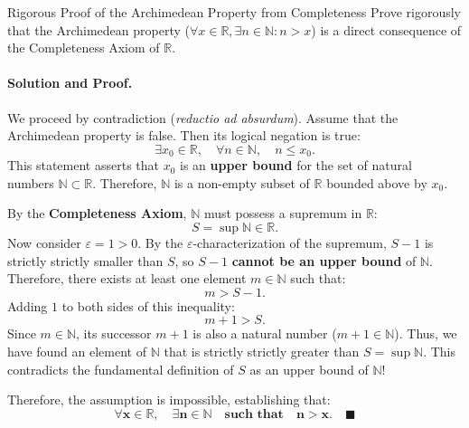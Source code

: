 \begin{workedexample}{Rigorous Proof of the Archimedean Property from Completeness}
Prove rigorously that the Archimedean property ($\forall x \in \mathbb{R}, \exists n \in \mathbb{N}: n > x$) is a direct consequence of the Completeness Axiom of $\mathbb{R}$.

\paragraph{Solution and Proof.}
We proceed by contradiction (\textit{reductio ad absurdum}).
Assume that the Archimedean property is false. Then its logical negation is true:
\[
\exists x_0 \in \mathbb{R}, \quad \forall n \in \mathbb{N}, \quad n \le x_0.
\]
This statement asserts that $x_0$ is an \textbf{upper bound} for the set of natural numbers $\mathbb{N} \subset \mathbb{R}$.
Therefore, $\mathbb{N}$ is a non-empty subset of $\mathbb{R}$ bounded above by $x_0$.

By the \textbf{Completeness Axiom}, $\mathbb{N}$ must possess a supremum in $\mathbb{R}$:
\[
S = \sup \mathbb{N} \in \mathbb{R}.
\]
Now consider $\varepsilon = 1 > 0$.
By the $\varepsilon$-characterization of the supremum, $S - 1$ is strictly strictly smaller than $S$, so $S - 1$ \textbf{cannot be an upper bound} of $\mathbb{N}$.
Therefore, there exists at least one element $m \in \mathbb{N}$ such that:
\[
m > S - 1.
\]
Adding $1$ to both sides of this inequality:
\[
m + 1 > S.
\]
Since $m \in \mathbb{N}$, its successor $m + 1$ is also a natural number ($m + 1 \in \mathbb{N}$).
Thus, we have found an element of $\mathbb{N}$ that is strictly strictly greater than $S = \sup \mathbb{N}$.
This contradicts the fundamental definition of $S$ as an upper bound of $\mathbb{N}$!

Therefore, the assumption is impossible, establishing that:
\[
\mathbf{\forall x \in \mathbb{R}, \quad \exists n \in \mathbb{N} \quad \text{such that} \quad n > x}. \quad \blacksquare
\]
\end{workedexample}

